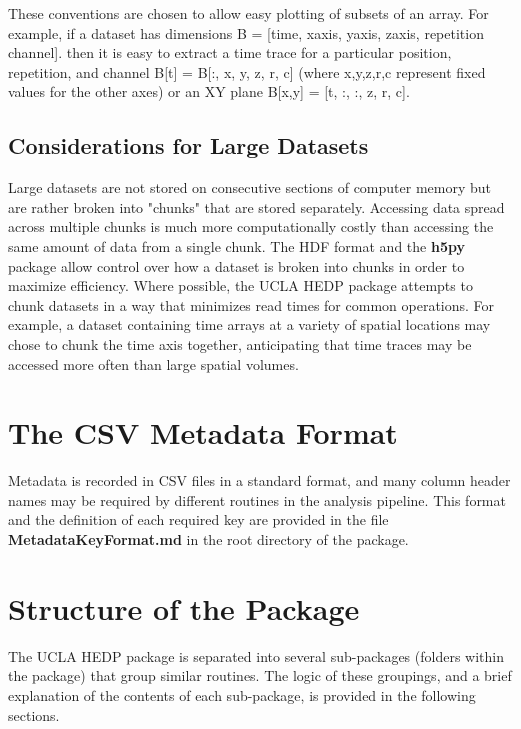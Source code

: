 \documentclass[12pt]{article}
\newcommand{\loc}[1]{{\bf \fontfamily{pcr}\selectfont #1}}
\begin{document}
These conventions are chosen to allow easy plotting of subsets of an array. For example, if a dataset has dimensions B = [time, xaxis, yaxis, zaxis, repetition channel]. then it is easy to extract a time trace for a particular position, repetition, and channel B[t] = B[:, x, y, z, r, c] (where x,y,z,r,c represent fixed values for the other axes) or an XY plane B[x,y] = [t, :, :, z, r, c]. 

\subsection{Considerations for Large Datasets}

Large datasets are not stored on consecutive sections of computer memory but are rather broken into "chunks" that are stored separately. Accessing data spread across multiple chunks is much more computationally costly than accessing the same amount of data from a single chunk. The HDF format and the \loc{h5py} package allow control over how a dataset is broken into chunks in order to maximize efficiency. Where possible, the UCLA HEDP package attempts to chunk datasets in a way that minimizes read times for common operations. For example, a dataset containing time arrays at a variety of spatial locations may chose to chunk the time axis together, anticipating that time traces may be accessed more often than large spatial volumes.


\section{The CSV Metadata Format\label{csv_format}}

Metadata is recorded in CSV files in a standard format, and many column header names may be required by different routines in the analysis pipeline. This format and the definition of each required key are provided in the file \loc{MetadataKeyFormat.md} in the root directory of the package.



\section{Structure of the Package}

The UCLA HEDP package is separated into several sub-packages (folders within the package) that group similar routines. The logic of these groupings, and a brief explanation of the contents of each sub-package, is provided in the following sections.
\end{document}
